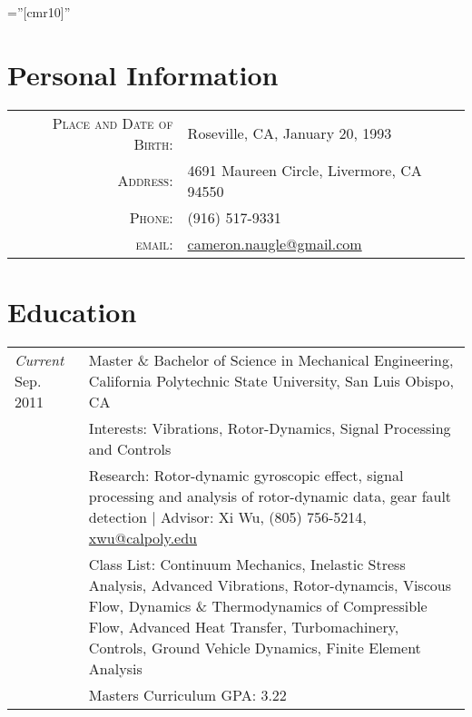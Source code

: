 \documentclass[10pt]{article} %
\begin{document}
\thispagestyle{empty} %

\font\fb=''[cmr10]'' %
\setlength{\linewidth}{6.5in}
\setlength{\hsize}{6.5in}

\par{\bigskip\par} %

\section{ Personal Information}

\begin{tabular}{rl}
	\textsc{Place and Date of Birth:} & Roseville, CA, January 20, 1993 \\
	\textsc{Address:} & 4691 Maureen Circle, Livermore, CA 94550 \\
	\textsc{Phone:} &  (916) 517-9331\\
	\textsc{email:} & \href{mailto:cameron.naugle@gmail.com}{cameron.naugle@gmail.com}\\[-.5em]
\end{tabular}

\section{ Education}

\begin{tabular}{p{.6in}|p{5.5in}}	
	\emph{Current} Sep. 2011 & Master \& Bachelor of Science in Mechanical Engineering,  California Polytechnic State University, San Luis Obispo, CA\\
	& \footnotesize{Interests: Vibrations, Rotor-Dynamics, Signal Processing and Controls}\\
	& \footnotesize{Research: Rotor-dynamic gyroscopic effect, signal processing and analysis of rotor-dynamic data, gear fault detection | Advisor: Xi Wu, (805) 756-5214}, \href{mailto:xwu@calpoly.edu}{xwu@calpoly.edu}\\
	& \footnotesize{Class List: Continuum Mechanics, Inelastic Stress Analysis, Advanced Vibrations, Rotor-dynamcis, Viscous Flow, Dynamics \& Thermodynamics of Compressible Flow, Advanced Heat Transfer, Turbomachinery, Controls, Ground Vehicle Dynamics, Finite Element Analysis}\\
	& \footnotesize{Masters Curriculum GPA: 3.22}\\[-.5em]
\end{tabular}
\end{document}
